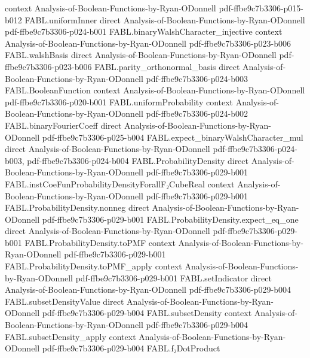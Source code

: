 \begin{theorem}
  {context}
  {Analysis-of-Boolean-Functions-by-Ryan-ODonnell}
  {pdf-ffbe9c7b3306-p015-b012}
\proofstep
  {FABL.uniformInner}
  {direct}
  {Analysis-of-Boolean-Functions-by-Ryan-ODonnell}
  {pdf-ffbe9c7b3306-p024-b001}
\proofstep
  {FABL.binaryWalshCharacter_injective}
  {context}
  {Analysis-of-Boolean-Functions-by-Ryan-ODonnell}
  {pdf-ffbe9c7b3306-p023-b006}
\proofstep
  {FABL.walshBasis}
  {direct}
  {Analysis-of-Boolean-Functions-by-Ryan-ODonnell}
  {pdf-ffbe9c7b3306-p023-b006}
\proofstep
  {FABL.parity_orthonormal_basis}
  {direct}
  {Analysis-of-Boolean-Functions-by-Ryan-ODonnell}
  {pdf-ffbe9c7b3306-p024-b003}
\proofstep
  {FABL.BooleanFunction}
  {context}
  {Analysis-of-Boolean-Functions-by-Ryan-ODonnell}
  {pdf-ffbe9c7b3306-p020-b001}
\proofstep
  {FABL.uniformProbability}
  {context}
  {Analysis-of-Boolean-Functions-by-Ryan-ODonnell}
  {pdf-ffbe9c7b3306-p024-b002}
\proofstep
  {FABL.binaryFourierCoeff}
  {direct}
  {Analysis-of-Boolean-Functions-by-Ryan-ODonnell}
  {pdf-ffbe9c7b3306-p025-b004}
\proofstep
  {FABL.expect_binaryWalshCharacter_mul}
  {direct}
  {Analysis-of-Boolean-Functions-by-Ryan-ODonnell}
  {pdf-ffbe9c7b3306-p024-b003,
    pdf-ffbe9c7b3306-p024-b004}
\proofstep
  {FABL.ProbabilityDensity}
  {direct}
  {Analysis-of-Boolean-Functions-by-Ryan-ODonnell}
  {pdf-ffbe9c7b3306-p029-b001}
\proofstep
  {FABL.instCoeFunProbabilityDensityForallF₂CubeReal}
  {context}
  {Analysis-of-Boolean-Functions-by-Ryan-ODonnell}
  {pdf-ffbe9c7b3306-p029-b001}
\proofstep
  {FABL.ProbabilityDensity.nonneg}
  {direct}
  {Analysis-of-Boolean-Functions-by-Ryan-ODonnell}
  {pdf-ffbe9c7b3306-p029-b001}
\proofstep
  {FABL.ProbabilityDensity.expect_eq_one}
  {direct}
  {Analysis-of-Boolean-Functions-by-Ryan-ODonnell}
  {pdf-ffbe9c7b3306-p029-b001}
\proofstep
  {FABL.ProbabilityDensity.toPMF}
  {context}
  {Analysis-of-Boolean-Functions-by-Ryan-ODonnell}
  {pdf-ffbe9c7b3306-p029-b001}
\proofstep
  {FABL.ProbabilityDensity.toPMF_apply}
  {context}
  {Analysis-of-Boolean-Functions-by-Ryan-ODonnell}
  {pdf-ffbe9c7b3306-p029-b001}
\proofstep
  {FABL.setIndicator}
  {direct}
  {Analysis-of-Boolean-Functions-by-Ryan-ODonnell}
  {pdf-ffbe9c7b3306-p029-b004}
\proofstep
  {FABL.subsetDensityValue}
  {direct}
  {Analysis-of-Boolean-Functions-by-Ryan-ODonnell}
  {pdf-ffbe9c7b3306-p029-b004}
\proofstep
  {FABL.subsetDensity}
  {context}
  {Analysis-of-Boolean-Functions-by-Ryan-ODonnell}
  {pdf-ffbe9c7b3306-p029-b004}
\proofstep
  {FABL.subsetDensity_apply}
  {context}
  {Analysis-of-Boolean-Functions-by-Ryan-ODonnell}
  {pdf-ffbe9c7b3306-p029-b004}
\proofstep
  {FABL.f₂DotProduct}

\end{theorem}
